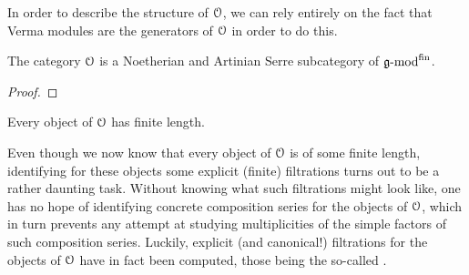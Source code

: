         In order to describe the structure of $\mathcal{O}$, we can rely entirely on the fact that Verma modules are the generators of $\mathcal{O}$ in order to do this.   
        \begin{proposition}
            The category $\mathcal{O}$ is a Noetherian and Artinian Serre subcategory of $\mathfrak{g}\text{-}\mathrm{mod}^{\mathrm{fin}}$.
        \end{proposition}
            \begin{proof}
                
            \end{proof}
        \begin{corollary}
            Every object of $\mathcal{O}$ has finite length.
        \end{corollary}
        \begin{remark}
            Even though we now know that every object of $\mathcal{O}$ is of some finite length, identifying for these objects some explicit (finite) filtrations turns out to be a rather daunting task. Without knowing what such filtrations might look like, one has no hope of identifying concrete composition series for the objects of $\mathcal{O}$, which in turn prevents any attempt at studying multiplicities of the simple factors of such composition series. Luckily, explicit (and canonical!) filtrations for the objects of $\mathcal{O}$ have in fact been computed, those being the so-called .  
        \end{remark}

